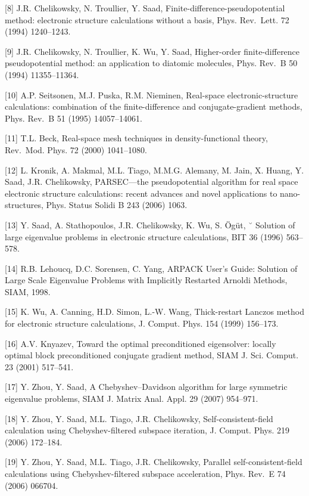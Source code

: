 \documentclass[
  10
]{article}
\begin{document}
{[}8{]} J.R. Chelikowsky, N. Troullier, Y. Saad,
Finite-difference-pseudopotential method: electronic structure
calculations without a basis, Phys. Rev.~Lett. 72 (1994) 1240--1243.

{[}9{]} J.R. Chelikowsky, N. Troullier, K. Wu, Y. Saad, Higher-order
finite-difference pseudopotential method: an application to diatomic
molecules, Phys. Rev.~B 50 (1994) 11355--11364.

{[}10{]} A.P. Seitsonen, M.J. Puska, R.M. Nieminen, Real-space
electronic-structure calculations: combination of the finite-difference
and conjugate-gradient methods, Phys. Rev.~B 51 (1995) 14057--14061.

{[}11{]} T.L. Beck, Real-space mesh techniques in density-functional
theory, Rev.~Mod. Phys. 72 (2000) 1041--1080.

{[}12{]} L. Kronik, A. Makmal, M.L. Tiago, M.M.G. Alemany, M. Jain, X.
Huang, Y. Saad, J.R. Chelikowsky, PARSEC---the pseudopotential algorithm
for real space electronic structure calculations: recent advances and
novel applications to nano-structures, Phys. Status Solidi B 243 (2006)
1063.

{[}13{]} Y. Saad, A. Stathopoulos, J.R. Chelikowsky, K. Wu, S. Ögüt, ˘
Solution of large eigenvalue problems in electronic structure
calculations, BIT 36 (1996) 563--578.

{[}14{]} R.B. Lehoucq, D.C. Sorensen, C. Yang, ARPACK User's Guide:
Solution of Large Scale Eigenvalue Problems with Implicitly Restarted
Arnoldi Methods, SIAM, 1998.

{[}15{]} K. Wu, A. Canning, H.D. Simon, L.-W. Wang, Thick-restart
Lanczos method for electronic structure calculations, J. Comput. Phys.
154 (1999) 156--173.

{[}16{]} A.V. Knyazev, Toward the optimal preconditioned eigensolver:
locally optimal block preconditioned conjugate gradient method, SIAM J.
Sci. Comput. 23 (2001) 517--541.

{[}17{]} Y. Zhou, Y. Saad, A Chebyshev--Davidson algorithm for large
symmetric eigenvalue problems, SIAM J. Matrix Anal. Appl. 29 (2007)
954--971.

{[}18{]} Y. Zhou, Y. Saad, M.L. Tiago, J.R. Chelikowsky,
Self-consistent-field calculation using Chebyshev-filtered subspace
iteration, J. Comput. Phys. 219 (2006) 172--184.

{[}19{]} Y. Zhou, Y. Saad, M.L. Tiago, J.R. Chelikowsky, Parallel
self-consistent-field calculations using Chebyshev-filtered subspace
acceleration, Phys. Rev.~E 74 (2006) 066704.
\end{document}
